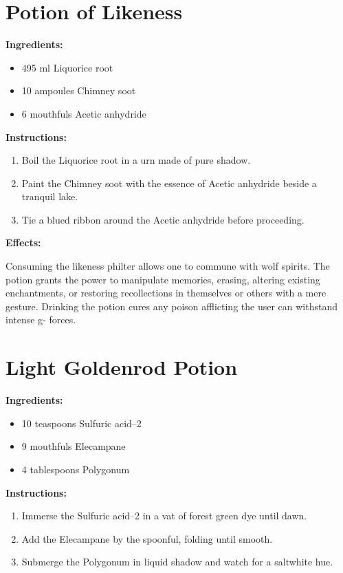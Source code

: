 \documentclass{article}
\begin{document}
\newpage
\section*{Potion of Likeness}

\textbf{Ingredients:}

\begin{itemize}
  \item 495 ml Liquorice root
  \item 10 ampoules Chimney soot
  \item 6 mouthfuls Acetic anhydride
\end{itemize}

\textbf{Instructions:}

\begin{enumerate}
  \item Boil the Liquorice root in a urn made of pure shadow.
  \item Paint the Chimney soot with the essence of Acetic anhydride beside a tranquil lake.
  \item Tie a blued ribbon around the Acetic anhydride before proceeding.
\end{enumerate}

\textbf{Effects:}

Consuming the likeness philter allows one to commune with wolf spirits. The potion grants the power to manipulate memories, erasing, altering existing enchantments, or restoring recollections in themselves or others with a mere gesture. Drinking the potion cures any poison afflicting the user can withstand intense g- forces.

\newpage
\section*{Light Goldenrod Potion}

\textbf{Ingredients:}

\begin{itemize}
  \item 10 teaspoons Sulfuric acid--2
  \item 9 mouthfuls Elecampane
  \item 4 tablespoons Polygonum
\end{itemize}

\textbf{Instructions:}

\begin{enumerate}
  \item Immerse the Sulfuric acid--2 in a vat of forest green dye until dawn.
  \item Add the Elecampane by the spoonful, folding until smooth.
  \item Submerge the Polygonum in liquid shadow and watch for a saltwhite hue.
\end{enumerate}
\end{document}
